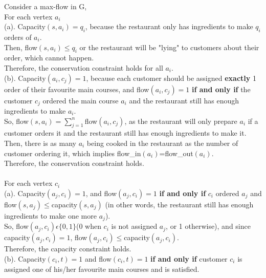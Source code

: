 \documentclass{assignment-373}
\begin{document}
\begin{enumerate}
    \phantom{=} \phantom{=} Consider a max-flow in G,\\
    \phantom{=} \phantom{=} For each vertex $a_i$\\
    \phantom{=} \phantom{=} \phantom{=} (a). Capacity$(s,a_i)=q_i$, because the restaurant only has ingredients to make $q_i$ orders of $a_i$.\\
    \phantom{=} \phantom{=} \phantom{=} Then, flow$(s,a_i)\leq q_i$ or the restaurant will be "lying" to customers about their order, which cannot happen.\\
    \phantom{=} \phantom{=} \phantom{=} Therefore, the conservation constraint holds for all $a_i$.\\
    \phantom{=} \phantom{=} \phantom{=} (b). Capacity$(a_i,c_j)=1$, because each customer should be assigned \textbf{exactly} 1 order of their favourite main courses, and flow$(a_i,c_j)=1$ \textbf{if and only if} the customer $c_j$ ordered the main course $a_i$ and the restaurant still has enough ingredients to make $a_i$.\\
    \phantom{=} \phantom{=} \phantom{=} So, flow$(s,a_i)=\sum_{j=1}^{n}$flow$(a_i,c_j)$, as the restaurant will only prepare $a_i$ if a customer orders it and the restaurant still has enough ingredients to make it.\\
    \phantom{=} \phantom{=} \phantom{=} Then, there is as many $a_i$ being cooked in the restaurant as the number of customer ordering it, which implies flow\_in$(a_i)$=flow\_out$(a_i)$.\\
    \phantom{=} \phantom{=} \phantom{=} Therefore, the conservation constraint holds.\\
    \\
    \phantom{=} \phantom{=} For each vertex $c_i$\\
    \phantom{=} \phantom{=} \phantom{=} (a). Capacity$(a_j,c_i)=1$, and flow$(a_j,c_i)=1$ \textbf{if and only if} $c_i$ ordered $a_j$ and flow$(s,a_j)\leq$capacity$(s,a_j)$ (in other words, the restaurant still has enough ingredients to make one more $a_j$).\\
    \phantom{=} \phantom{=} \phantom{=} So, flow$(a_j,c_i)\epsilon\{0,1\}$(0 when $c_i$ is not assigned $a_j$, or 1 otherwise), and since capacity$(a_j,c_i)=1$, flow$(a_j,c_i)\leq$capacity$(a_j,c_i)$.\\
    \phantom{=} \phantom{=} \phantom{=} Therefore, the capacity constraint holds.\\
    \phantom{=} \phantom{=} \phantom{=} (b). Capacity$(c_i,t)=1$ and flow$(c_i,t)=1$ \textbf{if and only if} customer $c_i$ is assigned one of his/her favourite main courses and is satisfied.\\

\end{enumerate}
\end{document}
